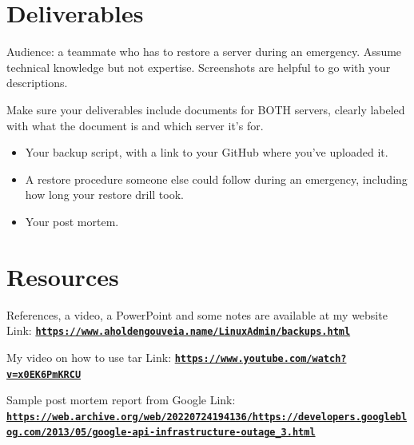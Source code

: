 \documentclass[12pt]{article}
\begin{document}
\section*{Deliverables}
Audience: a teammate who has to restore a server during an emergency. Assume technical knowledge but not expertise.  Screenshots are helpful to go with your descriptions.

Make sure your deliverables include documents for BOTH servers, clearly labeled with what the document is and which server it's for.
\begin{itemize}
    \item Your backup script, with a link to your GitHub where you've uploaded it.
    \item A restore procedure someone else could follow during an emergency, including how long your restore drill took.
    \item Your post mortem.
\end{itemize}

\section*{Resources}
References, a video, a PowerPoint and some notes are available at my website
Link: \href{https://www.aholdengouveia.name/LinuxAdmin/backups.html}{\textbf{\nolinkurl{https://www.aholdengouveia.name/LinuxAdmin/backups.html}}}

My video on how to use tar
Link: \href{https://www.youtube.com/watch?v=x0EK6PmKRCU}{\textbf{\nolinkurl{https://www.youtube.com/watch?v=x0EK6PmKRCU}}}

Sample post mortem report from Google
Link: \href{https://web.archive.org/web/20220724194136/https://developers.googleblog.com/2013/05/google-api-infrastructure-outage_3.html}{\textbf{\nolinkurl{https://web.archive.org/web/20220724194136/https://developers.googleblog.com/2013/05/google-api-infrastructure-outage_3.html}}}

\end{document}
